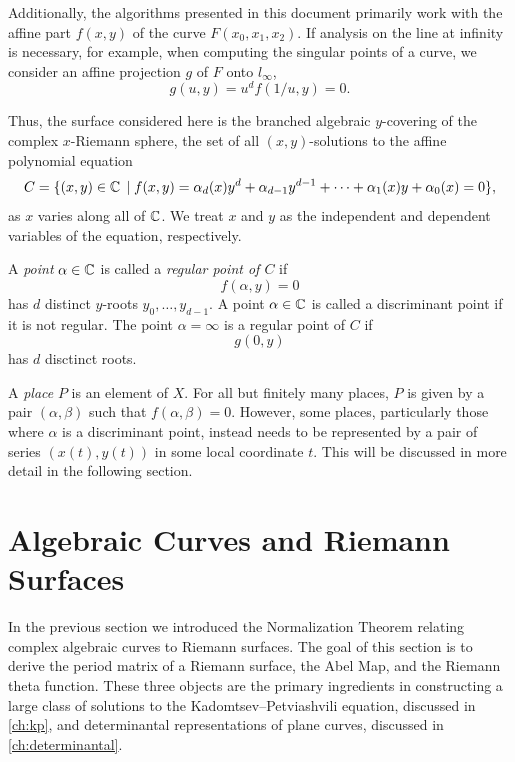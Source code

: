 Additionally, the algorithms presented in this document primarily work with the
affine part $f(x,y)$ of the curve $F(x_0,x_1,x_2)$. If analysis on the line at
infinity is necessary, for example, when computing the singular points of a
curve, we consider an affine projection $g$ of $F$ onto $l_\infty$,
\[
  g(u,y) = u^d f(1/u,y) = 0.
\]

Thus, the surface considered here is the branched algebraic $y$-covering of the
complex $x$-Riemann sphere, the set of all $(x,y)$-solutions to the affine
polynomial equation
\[
    C = \{ (x,y) \in \operatorname{\mathbb{C}} \; | \; f(x,y) = \alpha_d(x)y^d +
    \alpha_{d-1}y^{d-1} + \cdots + \alpha_1(x)y + \alpha_0(x) = 0\},
\]
as $x$ varies along all of $\operatorname{\mathbb{C}}$. We treat $x$ and $y$ as the independent and
dependent variables of the equation, respectively.

A {\it point} $\alpha \in \operatorname{\mathbb{C}}$ is called a {\it regular point of $C$} if
\[
  f(\alpha,y) = 0
\]
has $d$ distinct $y$-roots $y_0,\ldots,y_{d-1}$. A point $\alpha \in \operatorname{\mathbb{C}}$ is
called a discriminant point if it is not regular. The point $\alpha = \infty$ is
a regular point of $C$ if
\[
  g(0,y)
\]
has $d$ disctinct roots.

A {\it place} $P$ is an element of $X$. For all but finitely many places, $P$ is
given by a pair $(\alpha,\beta)$ such that $f(\alpha,\beta) = 0$. However, some
places, particularly those where $\alpha$ is a discriminant point, instead needs
to be represented by a pair of series $(x(t),y(t))$ in some local coordinate
$t$. This will be discussed in more detail in the following section.


\section{Algebraic Curves and Riemann
  Surfaces}\label{sec:background-algebraic-curves-and-riemann-surfaces}

In the previous section we introduced the Normalization Theorem relating complex
algebraic curves to Riemann surfaces. The goal of this section is to derive the
period matrix of a Riemann surface, the Abel Map, and the Riemann theta
function. These three objects are the primary ingredients in constructing a
large class of solutions to the Kadomtsev--Petviashvili equation, discussed in
\autoref{ch:kp}, and determinantal representations of plane curves, discussed in
\autoref{ch:determinantal}.

